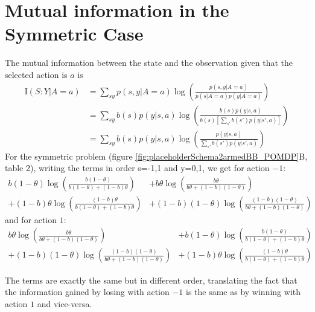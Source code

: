 \documentclass[aps,nofootinbib,groupaddress,superscriptaddress,reprint,amsmath,amssymb,graphicx,onecolumn,prx]{revtex4-2}
\begin{document}
\section{Mutual information in the Symmetric Case}
\label{app_mutual}
\noindent The mutual information between the state and the observation given that the selected action is $a$ is
\begin{align}
    \mathrm{I}(S:Y|A=a)&=\sum_{sy} p(s,y|A=a)\log\left(\frac{p(s,y|A=a)}{p(s|A=a)p(y|A=a)}\right) \\
    &=\sum_{sy} b(s)p(y|s,a)\log\left(\frac{b(s)p(y|s,a)}{b(s)\left[\sum_{s'}b(s')p(y|s',a)\right]}\right) \\
    &=\sum_{sy}b(s)p(y|s,a)\log\left(\frac{p(y|s,a)}{\sum_{s'}b(s')p(y|s',a)}\right)
\end{align}
For the symmetric problem (figure \ref{fig:placeholderSchema2armedBB_POMDP}B, table 2), writing the terms in order s=-1,1 and y=0,1, we get
for action $-1$:
\begin{align}
    b(1-\theta)\log\left(\frac{b(1-\theta)}{b(1-\theta)+(1-b)\theta}\right)&+b\theta\log\left(\frac{b\theta}{b\theta+(1-b)(1-\theta)}\right) \\
    +(1-b)\theta\log\left(\frac{(1-b)\theta}{b(1-\theta)+(1-b)\theta}\right)&+(1-b)(1-\theta)\log\left(\frac{(1-b)(1-\theta)}{b\theta+(1-b)(1-\theta)}\right)
\end{align}
and for action $1$:
\begin{align}
    b\theta\log\left(\frac{b\theta}{b\theta+(1-b)(1-\theta)}\right)&+b(1-\theta)\log\left(\frac{b(1-\theta)}{b(1-\theta)+(1-b)\theta}\right) \\
    +(1-b)(1-\theta)\log\left(\frac{(1-b)(1-\theta)}{b\theta+(1-b)(1-\theta)}\right)&+(1-b)\theta\log\left(\frac{(1-b)\theta}{b(1-\theta)+(1-b)\theta}\right)
\end{align}

The terms are exactly the same but in different order, translating the fact that the information gained by losing with action $-1$ is the same as by winning with action $1$ and vice-versa.


\newpage

\end{document}
